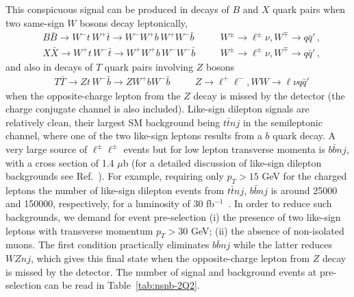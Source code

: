\documentclass[12pt,a4paper]{article}
\newcommand{\fbin}{fb$^{-1}$}
\begin{document}
This conspicuous signal can be produced in decays of $B$ and $X$ quark pairs when two same-sign $W$ bosons decay leptonically,
\begin{align}
& B \bar B \to W^- t \, W^+ \bar t \to W^- W^+ b \, W^+ W^- \bar b
&& \quad W^\pm \to \ell^\pm \nu , W^\mp \to q \bar q' \,, \nonumber \\
& X \bar X \to W^+ t \, W^- \bar t \to W^+ W^+ b \, W^- W^- \bar b 
&& \quad W^\pm \to \ell^\pm \nu , W^\mp \to q \bar q' \,,
\label{ec:ch2Q2} 
\end{align}
and also in decays of $T$ quark pairs involving $Z$ bosons 
\begin{align}
& T \bar T \to Zt \, W^- \bar b \to Z W^+b W^- \bar b
&& \quad Z \to \ell^+ \ell^- , WW \to \ell \nu q \bar q' 
\label{ec:ch2Q2b} 
\end{align}
when the opposite-charge lepton from the $Z$ decay is missed by the detector (the charge conjugate channel is also included). Like-sign dilepton signals are relatively clean, their largest SM background being $t \bar t nj$ in the semileptonic channel, where one of the two like-sign leptons results from a $b$ quark decay.
A very large source of $\ell^\pm \ell^\pm$ events but for low lepton transverse momenta is $b \bar b nj$, with a cross section of 1.4 $\mu$b (for a detailed discussion of like-sign dilepton backgrounds see Ref.~\cite{delAguila:2007em}). For example, requiring only $p_T > 15$ GeV for the charged leptons the number of like-sign dilepton events from $t \bar t nj$, $b \bar b nj$ is around 25000 and 150000, respectively, for a luminosity of 30 \fbin~\cite{delAguila:2007em}.
In order to reduce such backgrounds, we demand for event pre-selection (i) the presence of two like-sign leptons with transverse momentum $p_T > 30$ GeV; (ii) the absence of non-isolated muons. The first condition practically eliminates $b \bar b nj$ while the latter reduces $WZnj$, which gives this final state when the opposite-charge lepton from $Z$ decay is missed by the detector. The number of signal and background events at pre-selection can be read in Table~\ref{tab:nsnb-2Q2}. 
%
\end{document}
